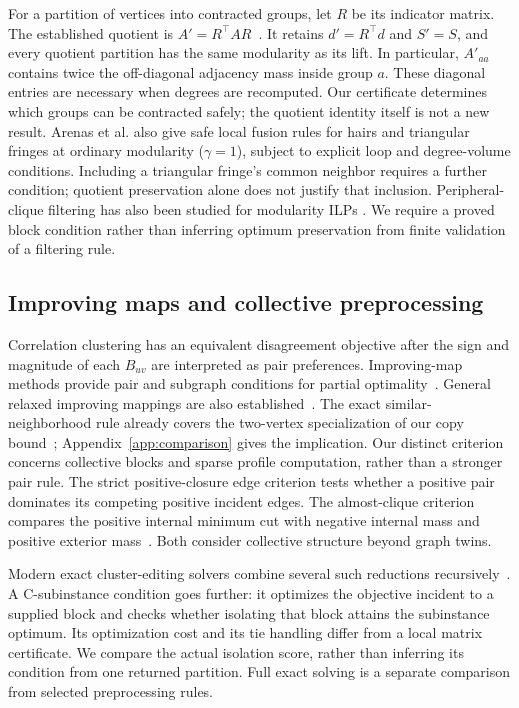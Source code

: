 \documentclass[sigconf,anonymous,review]{acmart}
\newcommand{\1}{\mathbf{1}}
\begin{document}
For a partition of vertices into contracted groups, let $R$ be its indicator
matrix. The established quotient is $A'=R^\top A R$~\cite{arenas2007size}. It retains
$d'=R^\top d$ and $S'=S$, and every quotient partition has the same modularity
as its lift. In particular, $A'_{aa}$ contains twice the off-diagonal adjacency
mass inside group $a$. These diagonal entries are necessary when degrees are
recomputed. Our certificate determines which groups can be contracted safely;
the quotient identity itself is not a new result. Arenas et al. also give
safe local fusion rules for hairs and triangular fringes at ordinary modularity
($\gamma=1$), subject to explicit loop and degree-volume conditions.
Including a triangular fringe's common neighbor requires a further condition;
quotient preservation alone does not justify that inclusion.
Peripheral-clique filtering has also been studied for modularity ILPs
\cite{lorena2019clique}. We require a proved block condition rather than
inferring optimum preservation from finite validation of a filtering rule.

\subsection{Improving maps and collective preprocessing}
Correlation clustering has an equivalent disagreement objective after the sign
and magnitude of each $B_{uv}$ are interpreted as pair preferences. Improving-map
methods provide pair and subgraph conditions for partial optimality~\cite{lange2018partial,lange2019combinatorial}.
General relaxed improving mappings are also established~\cite{shekhovtsov2014persistency}.
The exact similar-neighborhood rule already covers the two-vertex specialization
of our copy bound~\cite{bocker2011exact}; Appendix~\ref{app:comparison} gives
the implication. Our distinct criterion concerns collective blocks and sparse
profile computation, rather than a stronger pair rule.
The strict positive-closure edge criterion tests whether a positive pair
dominates its competing positive incident edges. The almost-clique criterion
compares the positive internal minimum cut with negative internal mass and
positive exterior mass~\cite{bocker2011exact}. Both consider collective structure beyond graph twins.

Modern exact cluster-editing solvers combine several such reductions
recursively~\cite{blasius2022branch}. A C-subinstance condition goes further: it optimizes the objective
incident to a supplied block and checks whether isolating that block attains the
subinstance optimum. Its optimization cost and its tie handling differ from a
local matrix certificate. We compare the actual isolation score, rather than
inferring its condition from one returned partition. Full exact solving is a
separate comparison from selected preprocessing rules.
\end{document}
